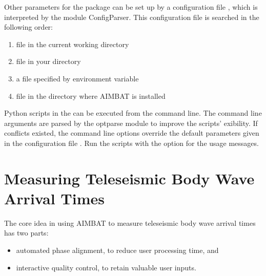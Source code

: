\documentclass[letterpaper,10pt,english]{sphinxmanual}
\begin{document}
Other parameters for the package can be set up by a configuration file , which is interpreted by the module ConfigParser. This configuration file is searched in the following order:
\begin{enumerate}
\item {} 
file  in the current working directory

\item {} 
file  in your  directory

\item {} 
a file specified by environment variable 

\item {} 
file  in the directory where AIMBAT is installed

\end{enumerate}

Python scripts in the  can be executed from the command line. The command line arguments are parsed by the optparse module to improve the scripts' exibility. If conflicts existed, the command line options override the default parameters given in the configuration file . Run the scripts with the  option for the usage messages.


\chapter{Measuring Teleseismic Body Wave Arrival Times}
\label{docfiles/PickingTravelTimes::doc}\label{docfiles/PickingTravelTimes:measuring-teleseismic-body-wave-arrival-times}
The core idea in using AIMBAT to measure teleseismic body wave arrival times has two parts:
\begin{itemize}
\item {} 
automated phase alignment, to reduce user processing time, and

\item {} 
interactive quality control, to retain valuable user inputs.

\end{itemize}
\end{document}
